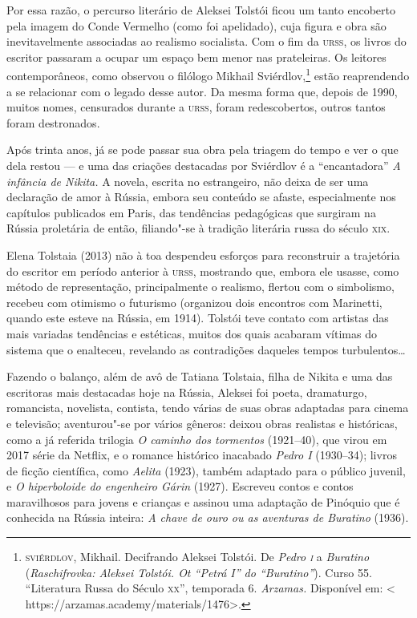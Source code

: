 Por essa razão, o percurso literário de Aleksei Tolstói ficou um tanto
encoberto pela imagem do Conde Vermelho (como foi apelidado), cuja
figura e obra são inevitavelmente associadas ao realismo socialista. Com
o fim da \textsc{urss}, os livros do escritor passaram a ocupar um espaço bem
menor nas prateleiras. Os leitores contemporâneos, como observou o
filólogo Mikhail Sviérdlov,\footnote{\textsc{sviérdlov}, Mikhail. Decifrando
  Aleksei Tolstói. De \emph{Pedro \textsc{i}} a \emph{Buratino}
  (\emph{Raschifrovka: Aleksei Tolstói. Ot ``Petrá I'' do
  ``Buratino''}). Curso 55. ``Literatura Russa do Século \textsc{xx}'', temporada
  6. \emph{Arzamas.} Disponível em: \textless{}
  https://arzamas.academy/materials/1476\textgreater{}.} estão
reaprendendo a se relacionar com o legado desse autor. Da mesma forma
que, depois de 1990, muitos nomes, censurados durante a \textsc{urss}, foram
redescobertos, outros tantos foram destronados.

Após trinta anos, já se pode passar sua obra pela triagem do tempo e ver
o que dela restou --- e uma das criações destacadas por Sviérdlov é a
``encantadora'' \emph{A infância de Nikita.} A novela, escrita no
estrangeiro, não deixa de ser uma declaração de amor à Rússia, embora
seu conteúdo se afaste, especialmente nos capítulos publicados em Paris,
das tendências pedagógicas que surgiram na Rússia proletária de então,
filiando"-se à tradição literária russa do século \textsc{xix}.

Elena Tolstaia (2013) não à toa despendeu esforços para reconstruir a
trajetória do escritor em período anterior à \textsc{urss}, mostrando que, embora
ele usasse, como método de representação, principalmente o realismo,
flertou com o simbolismo, recebeu com otimismo o futurismo (organizou
dois encontros com Marinetti, quando este esteve na Rússia, em 1914).
Tolstói teve contato com artistas das mais variadas tendências e
estéticas, muitos dos quais acabaram vítimas do sistema que o enalteceu,
revelando as contradições daqueles tempos turbulentos\ldots{}

Fazendo o balanço, além de avô de Tatiana Tolstaia, filha de Nikita e
uma das escritoras mais destacadas hoje na Rússia, Aleksei foi poeta,
dramaturgo, romancista, novelista, contista, tendo várias de suas obras
adaptadas para cinema e televisão; aventurou"-se por vários gêneros:
deixou obras realistas e históricas, como a já referida trilogia \emph{O
caminho dos tormentos} (1921--40), que virou em 2017 série da Netflix, e
o romance histórico inacabado \emph{Pedro I} (1930--34); livros de
ficção científica, como \emph{Aelita} (1923), também adaptado para o
público juvenil, e \emph{O hiperboloide do engenheiro Gárin} (1927).
Escreveu contos e contos maravilhosos para jovens e crianças e assinou
uma adaptação de Pinóquio que é conhecida na Rússia inteira: \emph{A
chave de ouro ou as aventuras de Buratino} (1936).


